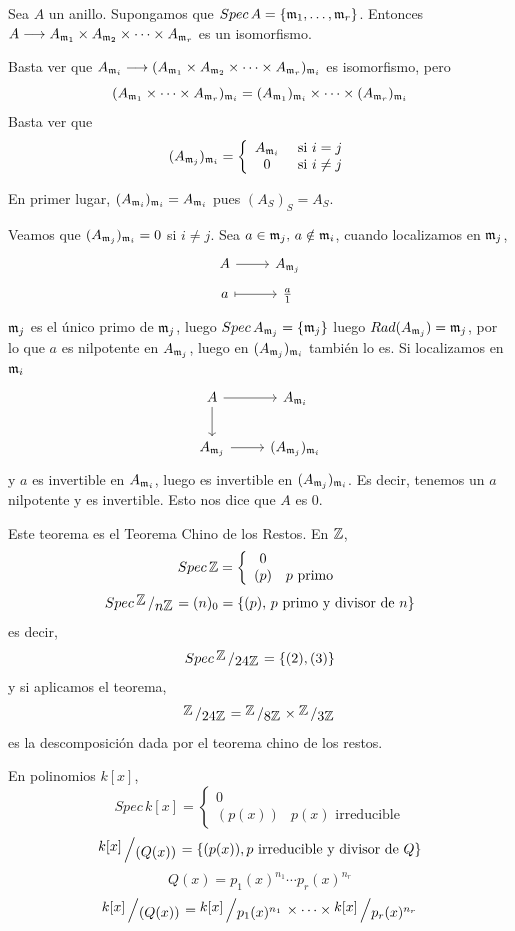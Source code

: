 \begin{teo}
    Sea $A$ un anillo. Supongamos que $Spec\, A = \{\mathfrak{m}_1, \ldots, \mathfrak{m}_r\}$. Entonces $A \longrightarrow A_{\mathfrak{m}_1} \times A_{\mathfrak{m}_2} \times \cdots \times A_{\mathfrak{m}_r}$ es un isomorfismo. 
\end{teo}
\begin{dem}
    Basta ver que $A_{\mathfrak{m}_i} \longrightarrow ( A_{\mathfrak{m}_1} \times A_{\mathfrak{m}_2} \times \cdots \times A_{\mathfrak{m}_r}) _{\mathfrak{m}_i}$ es isomorfismo, pero 
    $$ (A_{\mathfrak{m}_1} \times \cdots \times A_{\mathfrak{m}_r})_{\mathfrak{m}_i} =  (A_{\mathfrak{m}_1})_{\mathfrak{m}_i} \times \cdots \times (A_{\mathfrak{m}_r})_{\mathfrak{m}_i}$$
    Basta ver que 
    $$(A_{\mathfrak{m}_j})_{\mathfrak{m}_i} = \left\{ \begin{array}{cc}
            A_{\mathfrak{m}_i} & \text{ si } i=j  \\
         0  & \text{ si } i\neq j 
    \end{array} \right.$$

    En primer lugar, $(A_{\mathfrak{m}_i})_{\mathfrak{m}_i} = A_{\mathfrak{m}_i}$ pues $(A_S)_S = A_S$.

    Veamos que $(A_{\mathfrak{m}_j})_{\mathfrak{m}_i} = 0$ si $i \neq j$. Sea $a\in \mathfrak{m}_j, \, a\notin \mathfrak{m}_i$, cuando localizamos en $\mathfrak{m} _j$, 
    $$\bt A \rar & A_{\m_j} \\[-5mm] a \rar[mapsto] & \frac{a}{1}  \et$$
    $\mathfrak{m}_j$ es el \'unico primo de $\mathfrak{m}_j$, luego $Spec\, A_{\mathfrak{m}_j} = \{\mathfrak{m}_j\}$ luego $Rad(A_{\mathfrak{m}_j}) = \mathfrak{m}_j$, por lo que $a$ es nilpotente en $A_{\mathfrak{m}_j}$, luego en $(A_{\mathfrak{m}_j})_{\mathfrak{m}_i}$ tambi\'en lo es. Si localizamos en $\mathfrak{m}_i$
    $$\bt A \rar\arrow{d} & A_{\m_i} \\ A_{\m_j} \rar & (A_{\m_j})_{\m_i} \et$$
    y $a$ es invertible en $A_{\mathfrak{m}_i}$, luego es invertible en $(A_{\mathfrak{m}_j})_{\mathfrak{m}_i}$. Es decir, tenemos un $a$ nilpotente y es invertible.  Esto nos dice que $A$ es 0. 
\end{dem}
\begin{obs}
    Este teorema es el Teorema Chino de los Restos. En $\mathbb{Z}$, 
    $$Spec\, \mathbb{Z} = \left\{ \begin{array}{cc}
         0 &  \\
         (p) & p \text{ primo} 
    \end{array} \right.$$
    $$Spec \, \modulo{\bb Z}{n \bb Z} = (n)_0 = \{(p), \, p \text{ primo y divisor de } n\}$$
     es decir, 
     $$Spec \, \modulo{\bb Z}{24\bb Z} = \{(2),(3)\}$$
     y si aplicamos el teorema, 
     $$\modulo{\bb Z}{24 \bb Z} = \modulo{\bb  Z}{8 \bb Z} \times \modulo{\bb Z}{3 \bb Z}$$
     es la descomposici\'on dada por el teorema chino de los restos.

     En polinomios $k[x]$, 
     $$Spec \, k[x] = \left\{ \begin{array}{cc}
         0 &  \\
         (p(x)) & p(x) \text{ irreducible} 
    \end{array} \right.$$
    $$\modulo{k[x]}{(Q(x))} = \{(p(x)), p \text{ irreducible y divisor de } Q\}$$
    $$Q(x)=p_1(x)^{n_1} \cdots p_r(x)^{n_r}$$
    $$\modulo{k[x]}{(Q(x))} = \modulo{k[x]}{p_1(x)^{n_1}} \times \cdots \times \modulo{k[x]}{p_r(x)^{n_r}}$$
\end{obs}
